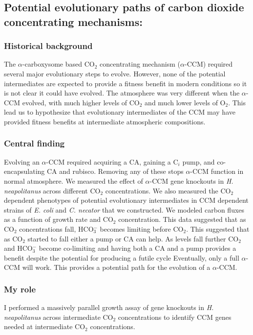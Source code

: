\documentclass{article}
\begin{document}

\newrefsection
\subsection{Potential evolutionary paths of carbon dioxide concentrating mechanisms:}\label{CCM_EVO}
\subsubsection{Historical background}
The $\alpha$-carboxysome based CO$_2$ concentrating mechanism ($\alpha$-CCM) required several major evolutionary steps to evolve.
However, none of the potential intermediates are expected to provide a fitness benefit in modern conditions so it is not clear it could have evolved.
The atmosphere was very different when the $\alpha$-CCM evolved, with much higher levels of CO$_2$ and much lower levels of O$_2$.
This lead us to hypothesize that evolutionary intermediates of the CCM may have provided fitness benefits at intermediate atmospheric compositions.
%
\subsubsection{Central finding}
Evolving an $\alpha$-CCM required acquiring a CA, gaining a C$_i$ pump, and co-encapsulating CA and rubisco. 
Removing any of these stops $\alpha$-CCM function in normal atmosphere.
We measured the effect of $\alpha$-CCM gene knockouts in \textit{H. neapolitanus} across different CO$_2$ concentrations.
We also measured  the CO$_2$ dependent phenotypes of potential evolutionary intermediates in CCM dependent strains of \textit{E. coli} and \textit{C. necator} that we constructed.
We modeled carbon fluxes as a function of growth rate and CO$_2$ concentration.
This data suggested that as CO$_2$ concentrations fall, HCO$_{3}^{-}$ becomes limiting before CO$_2$.
This suggested that as CO$_2$ started to fall either a pump or CA can help.
As levels fall further CO$_2$ and HCO$_{3}^{-}$ become co-limiting and having both a CA and a pump provides a benefit despite the potential for producing a futile cycle
Eventually, only a full $\alpha$-CCM will work.
This provides a potential path for the evolution of a $\alpha$-CCM.
%
\subsubsection{My role}
I performed a massively parallel growth assay of gene knockouts in \textit{H. neapolitanus} across intermediate CO$_2$ concentrations to identify CCM genes needed at intermediate CO$_2$ concentrations.
%
\end{document}
